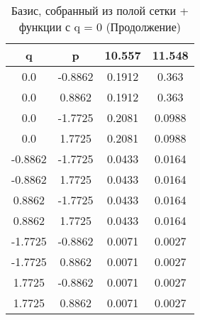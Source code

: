 \documentclass[a4paper,14pt]{extarticle}
\begin{document}
\begin{landscape}
\begin{table}[H]
\centering
\caption{Базис, собранный из полой сетки + функции с q = 0 (Продолжение)}
\begin{tabular}{|c|c|*{2}{c}|}
\hline
q       & p       & 10.557 & 11.548 \\ 
\hline                              
0.0     & -0.8862 & 0.1912 & 0.363  \\ 
0.0     & 0.8862  & 0.1912 & 0.363  \\ 
0.0     & -1.7725 & 0.2081 & 0.0988 \\ 
0.0     & 1.7725  & 0.2081 & 0.0988 \\ 
-0.8862 & -1.7725 & 0.0433 & 0.0164 \\ 
-0.8862 & 1.7725  & 0.0433 & 0.0164 \\ 
0.8862  & -1.7725 & 0.0433 & 0.0164 \\ 
0.8862  & 1.7725  & 0.0433 & 0.0164 \\ 
-1.7725 & -0.8862 & 0.0071 & 0.0027 \\ 
-1.7725 & 0.8862  & 0.0071 & 0.0027 \\ 
1.7725  & -0.8862 & 0.0071 & 0.0027 \\ 
1.7725  & 0.8862  & 0.0071 & 0.0027 \\ 
\hline
\end{tabular}
\end{table} 


\end{landscape}
\end{document}

